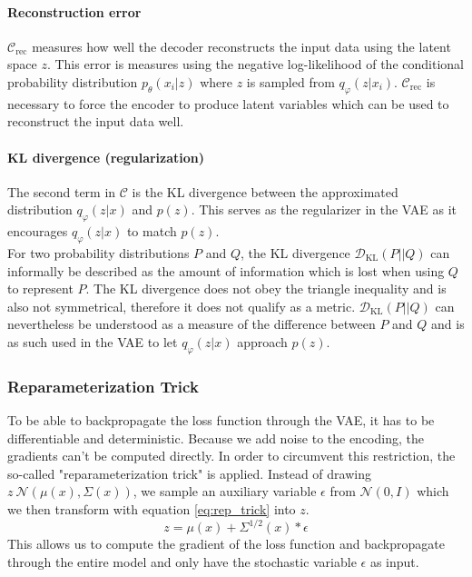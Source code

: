 \documentclass[twoside,11pt,a4paper]{article}
\theoremstyle{break}
\begin{document}
\paragraph{Reconstruction error}
$\mathcal{C}_{\mathrm{rec}}$ measures how well the decoder reconstructs the input data using the latent space $z$.
This error is measures using the negative log-likelihood of the conditional probability distribution $p_\theta(x_i|z)$ where $z$ is sampled from $q_\varphi(z | x_i)$.
$\mathcal{C}_{\mathrm{rec}}$ is necessary to force the encoder to produce latent variables which can be used to reconstruct the input data well.


\paragraph{KL divergence (regularization)}
The second term in $\mathcal{C}$ is the KL divergence between the approximated distribution $q_\varphi(z|x)$ and $p(z)$. This serves as the regularizer in the VAE as it encourages $q_\varphi(z|x)$ to match $p(z)$.\\

For two probability distributions $P$ and $Q$, the KL divergence $\mathcal{D}_{\mathrm{KL}}(P||Q)$ can informally be described as the amount of information which is lost when using $Q$ to represent $P$.
The KL divergence does not obey the triangle inequality and is also not symmetrical, therefore it does not qualify as a metric.
$\mathcal{D}_{\mathrm{KL}}(P||Q)$ can nevertheless be understood as a measure of the difference between $P$ and $Q$ and is as such used in the VAE to let $q_\varphi(z|x)$ approach $p(z)$.





\subsubsection{Reparameterization Trick}
To be able to backpropagate the loss function through the VAE, it has to be differentiable and deterministic.
Because we add noise to the encoding, the gradients can't be computed directly. In order to circumvent this restriction, the so-called "reparameterization trick" is applied.
Instead of drawing $z ~ \mathcal{N}(\mu(x), \Sigma(x))$, we sample an auxiliary variable $\epsilon$ from $\mathcal{N}(0, I)$ which we then transform with equation \ref{eq:rep_trick} into $z$.
\begin{equation}
  \label{eq:rep_trick}
  z = \mu(x) + \Sigma^{1/2}(x)*\epsilon
\end{equation}
This allows us to compute the gradient of the loss function and backpropagate through the entire model and only have the stochastic variable $\epsilon$ as input.\\\\
\end{document}
